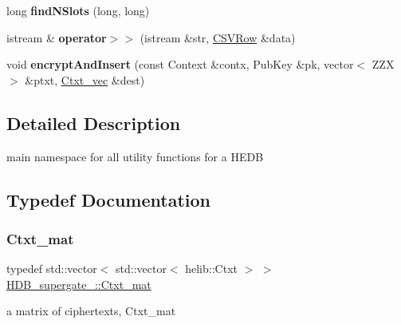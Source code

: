 \begin{DoxyCompactItemize}
\item 
\mbox{\label{namespaceHDB__supergate___a6749e17e945751fdc476b5261fd5cfc4}} 
long {\bfseries find\+N\+Slots} (long, long)
\item 
\mbox{\label{namespaceHDB__supergate___ac56b9dc7cd1fdf4bd57aae660839d1b8}} 
istream \& {\bfseries operator$>$$>$} (istream \&str, \hyperlink{classHDB__supergate___1_1CSVRow}{C\+S\+V\+Row} \&data)
\item 
\mbox{\label{namespaceHDB__supergate___a287bd0316c75a81e2b7c8efb5b7d662b}} 
void {\bfseries encrypt\+And\+Insert} (const Context \&contx, Pub\+Key \&pk, vector$<$ Z\+ZX $>$ \&ptxt, \hyperlink{namespaceHDB__supergate___ade0781b5973aae08b689ed72b30511fb}{Ctxt\+\_\+vec} \&dest)
\end{DoxyCompactItemize}


\subsection{Detailed Description}
main namespace for all utility functions for a H\+E\+DB 

\subsection{Typedef Documentation}
\mbox{\label{namespaceHDB__supergate___a46a3fb2b98c95dc7615203376c4ad0c8}} 
\subsubsection{\texorpdfstring{Ctxt\+\_\+mat}{Ctxt\_mat}}
{\footnotesize\ttfamily typedef std\+::vector$<$ std\+::vector$<$ helib\+::\+Ctxt $>$ $>$ \hyperlink{namespaceHDB__supergate___a46a3fb2b98c95dc7615203376c4ad0c8}{H\+D\+B\+\_\+supergate\+\_\+\+::\+Ctxt\+\_\+mat}}

a matrix of ciphertexts, Ctxt\+\_\+mat \mbox{\label{namespaceHDB__supergate___ade0781b5973aae08b689ed72b30511fb}} 
